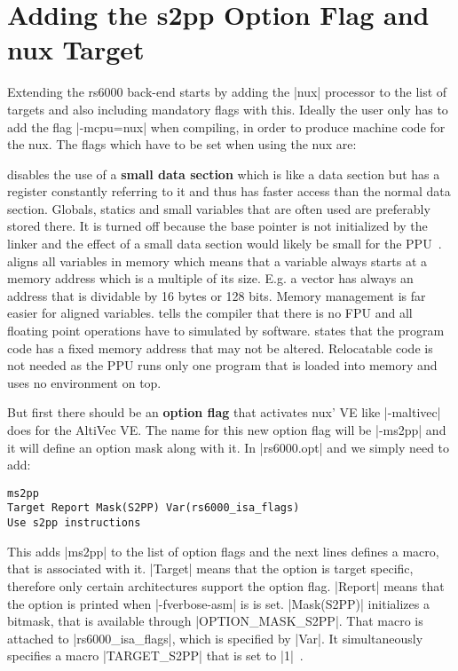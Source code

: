 \section{Adding the s2pp Option Flag and nux Target}
Extending the rs6000 back-end starts by adding the |nux| processor to the list of targets and also including mandatory flags with this.
Ideally the user only has to add the flag |-mcpu=nux| when compiling, in order to produce machine code for the nux.
The flags which have to be set when using the nux are:
\begin{description}
        disables the use of a \textbf{small data section} which is like a data section but has a register constantly referring to it and thus has faster access than the normal data section. Globals, statics and small variables that are often used are preferably stored there. It is turned off because the base pointer is not initialized by the linker and the effect of a small data section would likely be small for the \ac{PPU}~\cite{nuxmanual, ibmsda, websda}.
        aligns all variables in memory which means that a variable always starts at a memory address which is a multiple of its size. E.g. a vector has always an address that is dividable by 16 bytes or 128 bits. Memory management is far easier for aligned variables.
        tells the compiler that there is no FPU and all floating point operations have to simulated by software.
        states that the program code has a fixed memory address that may not be altered. Relocatable code is not needed as the \ac{PPU} runs only one program that is loaded into memory and uses no environment on top.
\end{description}

But first there should be an \textbf{option flag} that activates nux' \ac{VE} like |-maltivec| does for the AltiVec \ac{VE}.
The name for this new option flag will be |-ms2pp| and it will define an option mask along with it.
In |rs6000.opt| and we simply need to add:
\begin{lstlisting}
ms2pp
Target Report Mask(S2PP) Var(rs6000_isa_flags)
Use s2pp instructions
\end{lstlisting}
This adds |ms2pp| to the list of option flags and the next lines defines a macro, that is associated with it.
|Target| means that the option is target specific, therefore only certain architectures support the option flag.
|Report| means that the option is printed when |-fverbose-asm| is is set.
|Mask(S2PP)| initializes a bitmask, that is available through |OPTION_MASK_S2PP|.
That macro is attached to |rs6000_isa_flags|, which is specified by |Var|.
It simultaneously specifies a macro |TARGET_S2PP| that is set to |1|~\citep[ch.~8]{GCCint}.

